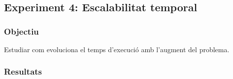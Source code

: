 
\subsection{Experiment 4: Escalabilitat temporal}

\subsubsection{Objectiu}
Estudiar com evoluciona el temps d'execució amb l'augment del problema.


\subsubsection{Resultats}




